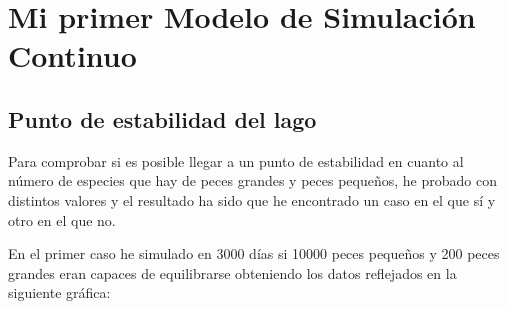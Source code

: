 \documentclass[11pt,a4paper]{report}
\begin{document}
\newpage
\chapter{Mi primer Modelo de Simulación Continuo}
\newpage
\section{Punto de estabilidad del lago}
Para comprobar si es posible llegar a un punto de estabilidad en cuanto al número de especies que hay de peces grandes y peces pequeños, he probado con distintos valores y el resultado ha sido que he encontrado un caso en el que sí y otro en el que no. 

En el primer caso he simulado en 3000 días si 10000 peces pequeños y 200 peces grandes eran capaces de equilibrarse obteniendo los datos reflejados en la siguiente gráfica:
\end{document}
